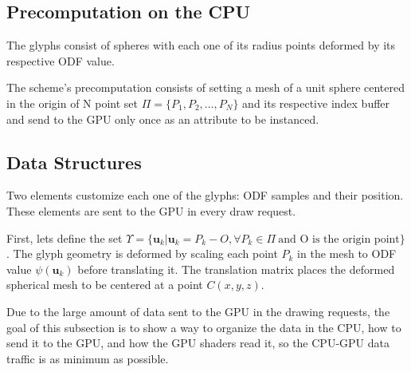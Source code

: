 \documentclass[twoside,twocolumn,10pt]{article}
\begin{document}



\subsection{Precomputation on the CPU}
\label{ssec::precomputation}

The glyphs consist of spheres with each one of its radius points deformed by its respective ODF value.

The scheme's precomputation consists of setting a mesh of a unit sphere centered in the origin of N point set $ \Pi = \{P_1, P_2, \dots, P_N\}$ and its respective index buffer and send to the GPU only once as an attribute to be instanced.




\subsection{Data Structures}
\label{ssec::datastruct}

Two elements customize each one of the glyphs: ODF samples and their position. These elements are sent to the GPU in every draw request.

First, lets define the set $\Upsilon = \{\bm{u}_k | \bm{u}_k = P_k - O, \forall P_k \in \Pi\ \text{and O is the origin point}\}$. The glyph geometry is deformed by scaling each point $P_k$ in the mesh to ODF value $\psi(\bm{u}_k)$ before translating it. The translation matrix places the deformed spherical mesh to be centered at a point $C(x, y, z)$. 

Due to the large amount of data sent to the GPU in the drawing requests, the goal of this subsection is to show a way to organize the data in the CPU, how to send it to the GPU, and how the GPU shaders read it, so the CPU-GPU data traffic is as minimum as possible. %
\end{document}
